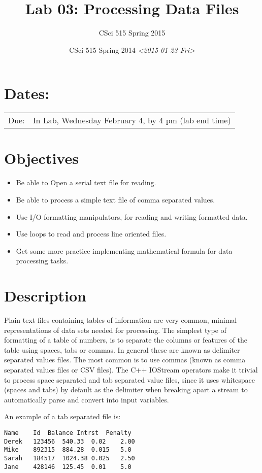 \documentclass[11pt]{article}
\author{CSci 515 Spring 2015}
\date{CSci 515 Spring 2014 \textit{<2015-01-23 Fri>}}
\title{Lab 03: Processing Data Files}
\begin{document}
\maketitle

\section*{Dates:}
\label{sec-1}
\begin{center}
\begin{tabular}{ll}
Due: & In Lab, Wednesday February 4, by 4 pm (lab end time)\\
\end{tabular}
\end{center}
\section*{Objectives}
\label{sec-2}
\begin{itemize}
\item Be able to Open a serial text file for reading.
\item Be able to process a simple text file of comma separated values.
\item Use I/O formatting manipulators, for reading and writing formatted data.
\item Use loops to read and process line oriented files.
\item Get some more practice implementing mathematical formula for data processing tasks.
\end{itemize}
\section*{Description}
\label{sec-3}
Plain text files containing tables of information are very common,
minimal representations of data sets needed for processing.  The
simplest type of formatting of a table of numbers, is to separate the
columns or features of the table using spaces, tabs or commas. In
general these are known as delimiter separated values files.  The most
common is to use commas (known as comma separated values files or CSV
files).  The C++ IOStream operators make it trivial to process space
separated and tab separated value files, since it uses whitespace
(spaces and tabs) by default as the delimiter when breaking apart a
stream to automatically parse and convert into input variables.

An example of a tab separated file is:

\begin{verbatim}
Name	Id	Balance	Intrst	Penalty
Derek	123456	540.33	0.02	2.00
Mike	892315	884.28	0.015	5.0
Sarah	184517	1024.38	0.025	2.50
Jane	428146	125.45	0.01	5.0
\end{verbatim}
\end{document}
